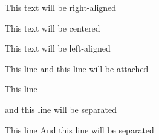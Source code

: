 \documentclass[a4paper]{article}
\begin{document}

\begin{flushright}
This text will be right-aligned
\end{flushright}

\begin{center}
This text will be centered
\end{center}

\begin{flushleft}
This text will be left-aligned
\end{flushleft}

This line
and this line will be attached

This line

and this line will be separated

This line \newline
And this line will be separated
\end{document}
